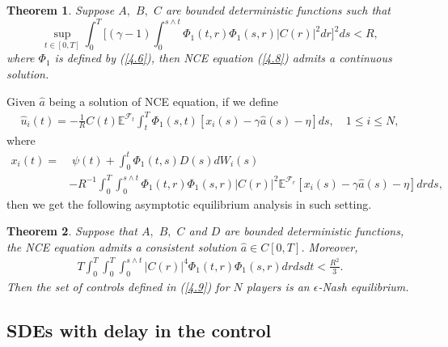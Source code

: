 \documentclass[11pt]{article}
\newtheorem{theorem}{Theorem}[section]
\def\dbE{\mathbb{E}}
\begin{document}
\begin{theorem}\label{theorem4-3}
Suppose $A,$ $B,$ $C$ are bounded deterministic functions such that
\[
\sup_{t\in [0,T]}\int_{0}^{T}\Big[(\gamma -1)\int_{0}^{s\wedge
t}\Phi_1(t,r)\Phi_1(s,r)|C(r)|^{2}dr\Big] ^{2}ds<R,
\]%
where $\Phi_1$ is defined by (\ref{4.6}), then NCE equation
(\ref{4.8}) admits a continuous solution.
\end{theorem}
Given $\widehat{a}$ being a solution of NCE equation, if we define
%
\begin{eqnarray}\label{4.9}
\widehat{u}_i(t)=-\frac 1 R
C(t)\dbE^{\mathcal{F}_t}\int_t^T\Phi_1(s,t) [x_i(s) -\gamma
\widehat{a}(s)-\eta]ds,\quad 1\leq i\leq N,
\end{eqnarray}
%
where
%
\begin{align*}
x_{i}(t) = & \; \psi(t)+\int_{0}^{t}\Phi_1(t,s)D(s)dW_{i}(s) \\
& -R^{-1}\int_{0}^{T}\int_{0}^{s\wedge t}\Phi_1(t,r)\Phi_1(s,r)|C(r)|^{2}\dbE^{\mathcal{F}_{r}}[x_{i}(s)-\gamma \widehat{a}(s)-\eta]drds,
\end{align*}
%
then we get the following asymptotic equilibrium analysis in such setting.


\begin{theorem}\label{theorem4-4}
Suppose that $A,$ $B,$ $C$ and $D$ are bounded deterministic functions,
the NCE equation admits a consistent solution $\widehat{a} \in C[0,T]$. Moreover,
%
\begin{eqnarray*}
T\int_{0}^{T}\int_{0}^{T}\int_{0}^{s\wedge t}|C(r)|^4\Phi_1(t,r)\Phi_1(s,r)drdsdt<\frac{R^{2}}{3}.
\end{eqnarray*}
%
Then the set of controls defined in (\ref{4.9}) for $N$ players is
an $\epsilon$-Nash equilibrium.
\end{theorem}



\subsection{SDEs with delay in the control}
\end{document}
